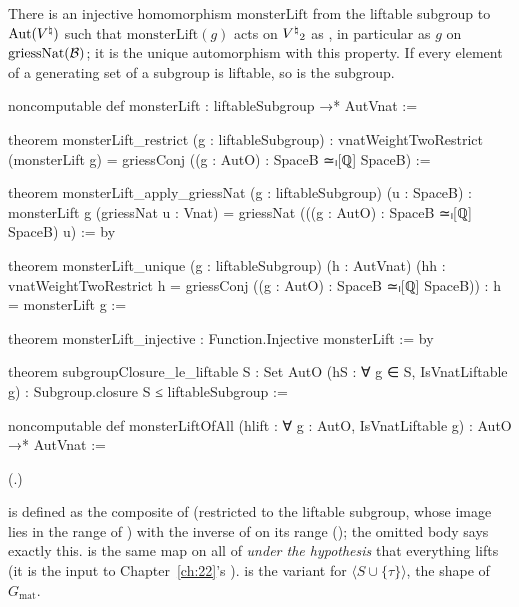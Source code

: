 \begin{theorem}\label{ch21:thm:monsterLift}
There is an injective homomorphism $\mathrm{monsterLift}$ from the liftable subgroup to $\operatorname{Aut}({V^{\natural}})$
such that $\mathrm{monsterLift}(g)$ acts on ${V^{\natural}}_2$ as , in particular as $g$ on
$\mathrm{griessNat}(\mathcal{B})$; it is the unique automorphism with this property.  If every element of
a generating set of a subgroup is liftable, so is the subgroup.
\end{theorem}
\begin{leancode}
noncomputable def monsterLift : liftableSubgroup →* AutVnat :=
\end{leancode}
\begin{leancode}
theorem monsterLift_restrict (g : liftableSubgroup) :
    vnatWeightTwoRestrict (monsterLift g) = griessConj ((g : AutO) : SpaceB ≃ₗ[ℚ] SpaceB) :=
\end{leancode}
\begin{leancode}
theorem monsterLift_apply_griessNat (g : liftableSubgroup) (u : SpaceB) :
    monsterLift g (griessNat u : Vnat) = griessNat (((g : AutO) : SpaceB ≃ₗ[ℚ] SpaceB) u) := by
\end{leancode}
\begin{leancode}
theorem monsterLift_unique (g : liftableSubgroup) (h : AutVnat)
    (hh : vnatWeightTwoRestrict h = griessConj ((g : AutO) : SpaceB ≃ₗ[ℚ] SpaceB)) :
    h = monsterLift g :=
\end{leancode}
\begin{leancode}
theorem monsterLift_injective : Function.Injective monsterLift := by
\end{leancode}
\begin{leancode}
theorem subgroupClosure_le_liftable {S : Set AutO} (hS : ∀ g ∈ S, IsVnatLiftable g) :
    Subgroup.closure S ≤ liftableSubgroup :=
\end{leancode}
\begin{leancode}
noncomputable def monsterLiftOfAll (hlift : ∀ g : AutO, IsVnatLiftable g) : AutO →* AutVnat :=
\end{leancode}
(.)
\begin{dictionary}
 is defined as the composite of  (restricted to the liftable subgroup,
whose image lies in the range of ) with the inverse of
 on its range (); the omitted body says exactly
this.   is the same map on all of  \emph{under the hypothesis}
 that everything lifts (it is the input to Chapter~\ref{ch:22}'s ).
 is the variant for $\langle S\cup\{\tau\}\rangle$, the shape of
$G_{\mathrm{mat}}$.
\end{dictionary}
